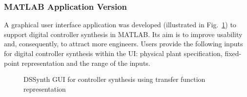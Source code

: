 \documentclass[10pt,conference]{IEEEtran}
\begin{document}
\subsubsection{MATLAB Application Version} 

A graphical user interface application was developed (illustrated in
Fig.~\ref{fig:gui-for-tf}) to support digital controller synthesis in
MATLAB.  Its aim is to improve usability and, consequently, to attract more
engineers.  Users provide the following inputs for digital controller
synthesis within the UI: physical plant specification, fixed-point
representation and the range of the inputs.

\begin{figure}[ht]
    \centering
		\hfil
		\hfil
		\hfil
		\hfil
    \caption{DSSynth GUI for controller synthesis using transfer function representation}
    \label{fig:gui-for-tf}
\end{figure}
\end{document}
